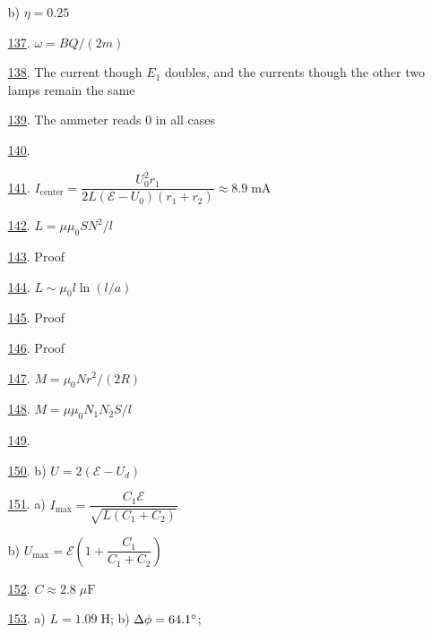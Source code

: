 \documentclass[11pt]{article}
\begin{document}
\begin{multicols}{2}
\begin{enumerate}
	b) $\eta=0.25$ %
	\item [\hyperlink{P137}{137}.] $\omega=BQ/(2m)$ %
	\item [\hyperlink{P138}{138}.] The current though $E_1$ doubles, and the currents though the other two lamps remain the same %
	\item [\hyperlink{P139}{139}.] The ammeter reads 0 in all cases %
	\item [\hyperlink{P140}{140}.]  %
	\item [\hyperlink{P141}{141}.] $I_\text{center}=\dfrac{U_0^2r_1}{2L(\mathcal{E}-U_0)(r_1+r_2)}\approx8.9\;\text{mA}$ %
	\item [\hyperlink{P142}{142}.] $L=\mu\mu_0SN^2/l$ %
	\item [\hyperlink{P143}{143}.] Proof %
	\item [\hyperlink{P144}{144}.] $L\sim\mu_0l\ln(l/a)$ %
	\item [\hyperlink{P145}{145}.] Proof %
	\item [\hyperlink{P146}{146}.] Proof %
	\item [\hyperlink{P147}{147}.] $M=\mu_0Nr^2/(2R)$ %
	\item [\hyperlink{P148}{148}.] $M=\mu\mu_0N_1N_2S/l$ %
	\item [\hyperlink{P149}{149}.]  %
	\item [\hyperlink{P150}{150}.] b) $U=2(\mathcal{E}-U_d)$ %
	\item [\hyperlink{P151}{151}.] a) $I_\text{max}=\dfrac{C_1\mathcal{E}}{\sqrt{L(C_1+C_2)}}$
	
	b) $U_\text{max}=\mathcal{E}\left(1+\dfrac{C_1}{C_1+C_2}\right)$ %
	\item [\hyperlink{P152}{152}.] $C\approx2.8\;\mu\text{F}$ %
	\item [\hyperlink{P153}{153}.] a) $L=1.09\;\text{H}$; b) $\Delta\phi=64.1\degree$;
	

\end{enumerate}
\end{multicols}
\end{document}
